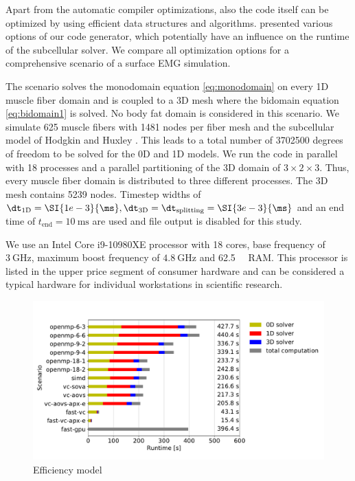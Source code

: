 Apart from the automatic compiler optimizations, also the code itself can be optimized by using efficient data structures and algorithms.  presented various options of our code generator, which potentially have an influence on the runtime of the subcellular solver. 
We compare all optimization options for a comprehensive scenario of a surface EMG simulation. 

The scenario solves the monodomain equation \cref{eq:monodomain} on every 1D muscle fiber domain and is coupled to a 3D mesh where the bidomain equation \cref{eq:bidomain1} is solved. No body fat domain is considered in this scenario.
We simulate 625 muscle fibers with 1481 nodes per fiber mesh and the subcellular model of Hodgkin and Huxley \cite{Hodgkin1952}. This leads to a total number of \num{3702500} degrees of freedom to be solved for the 0D and 1D models.
We run the code in parallel with 18 processes and a parallel partitioning of the 3D domain of $3 \times 2 \times 3$. Thus, every muscle fiber domain is distributed to three different processes.
The 3D mesh contains 5239 nodes. Timestep widths of $\dt_\text{1D} = \SI{1e-3}{\ms}, \dt_\text{3D} = \dt_\text{splitting} = \SI{3e-3}{\ms}$ and an end time of $t_\text{end} = \SI{10}{\ms}$ are used and file output is disabled for this study.

We use an Intel Core i9-10980XE processor with 18 cores, base frequency of $\SI{3}{\giga\hertz}$, maximum boost frequency of $\SI{4.8}{\giga\hertz}$ and \SI{62.5}{\giga\byte} RAM. This processor is listed in the upper price segment of consumer hardware and can be considered a typical hardware for individual workstations in scientific research.

\begin{figure}
  \centering%
  \includegraphics[width=\textwidth]{images/results/studies/fibers_emg_study.pdf}%
  \caption{Efficiency model}%
  \label{fig:fibers_emg_study}%
\end{figure}%

